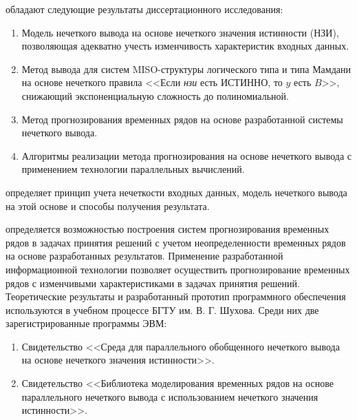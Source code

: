 {\novelty} обладают следующие результаты диссертационного исследования:
\begin{enumerate}[beginpenalty=10000] %
	\item Модель нечеткого вывода на основе нечеткого значения истинности (НЗИ), позволяющая адекватно учесть изменчивость характеристик входных данных.%
	\item Метод вывода для систем MISO-структуры логического типа и типа Мамдани на основе нечеткого правила <<Если \textit{нзи} есть ИСТИННО, то $y$ есть $B$>>, снижающий экспоненциальную сложность до полиномиальной.
	\item Метод прогнозирования временных рядов на основе разработанной системы нечеткого вывода.%
	\item Алгоритмы реализации метода прогнозирования на основе нечеткого вывода с применением технологии параллельных вычислений.%
\end{enumerate}

{\theoreticalValue} определяет принцип учета нечеткости входных данных, модель нечеткого вывода на этой основе и способы получения результата. %

{\practicalValue} определяется возможностью построения систем прогнозирования временных рядов в задачах принятия решений с учетом неопределенности временных рядов на основе разработанных результатов. Применение разработанной информационной технологии позволяет осуществить прогнозирование временных рядов с изменчивыми характеристиками в задачах принятия решений. Теоретические результаты и разработанный прототип программного обеспечения используются в учебном процессе БГТУ им. В. Г. Шухова. Среди них две зарегистрированные программы ЭВМ:
\begin{enumerate} 
\item Свидетельство  <<Среда для параллельного обобщенного нечеткого вывода на основе нечеткого значения истинности>>.
\item Свидетельство  <<Библиотека моделирования временных рядов на основе параллельного нечеткого вывода с использованием нечеткого значения истинности>>.
\end{enumerate}

